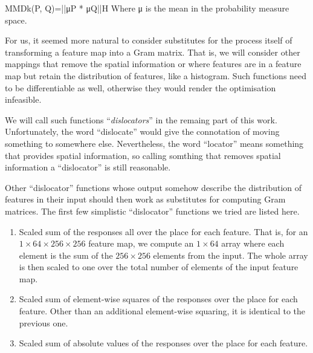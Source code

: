 \documentclass[runningheads]{llncs}
\begin{document}
MMDk(P, Q)=||μP * μQ||H Where μ is  the mean in the probability measure space.

For us, it seemed more natural to consider substitutes for the process itself of 
transforming a feature map into a Gram matrix. 
That is, we will consider other
mappings that remove the spatial information or where features are in a feature map but retain
the distribution of features, like a histogram.
Such functions need to be differentiable as well, otherwise they would render the 
optimisation infeasible.

We will call such functions ``\emph{dislocators}'' in the remaing part of this work.
Unfortunately, the word ``dislocate'' would give the connotation of moving something to somewhere else.
Nevertheless, the word ``locator'' means something that provides spatial information,
so calling somthing that removes spatial information a ``dislocator'' is still reasonable.

Other ``dislocator'' functions whose output somehow describe the 
distribution of features in their input should then work as substitutes
for computing Gram matrices.
The first few simplistic ``dislocator'' functions we tried are listed here.
\begin{enumerate}
\item Scaled sum of the responses all over the place for each feature.
That is, for an $1\times64\times256\times256$ feature map,
we compute an $1\times64$ array where each element is the sum of the
$256\times256$ elements from the input.
The whole array is then scaled to one over the total number of elements of the input feature map.
\item Scaled sum of element-wise squares of the responses over the place for each feature.
Other than an additional element-wise squaring, it is identical to the previous one.
\item Scaled sum of absolute values of the responses over the place for each feature.
\end{enumerate}
\end{document}
